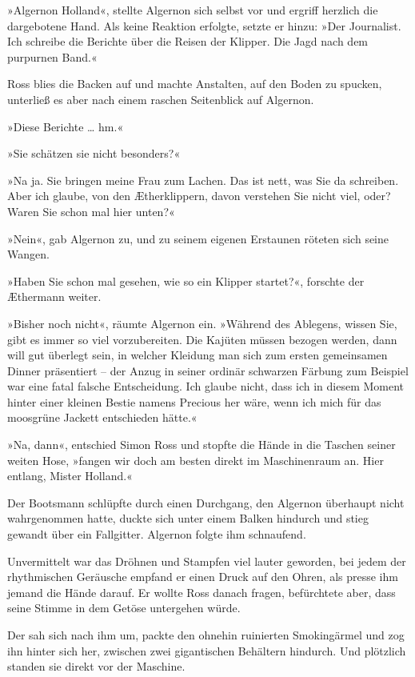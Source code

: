 »Algernon Holland«, stellte Algernon sich selbst vor und ergriff
herzlich die dargebotene Hand. Als keine Reaktion erfolgte, setzte
er hinzu: »Der Journalist. Ich schreibe die Berichte über die
Reisen der Klipper. Die Jagd nach dem purpurnen Band.«

Ross blies die Backen auf und machte Anstalten, auf den Boden zu
spucken, unterließ es aber nach einem raschen Seitenblick auf
Algernon.

»Diese Berichte \ldots{} hm.«

»Sie schätzen sie nicht besonders?«

»Na ja. Sie bringen meine Frau zum Lachen. Das ist nett, was Sie da
schreiben. Aber ich glaube, von den Ætherklippern, davon verstehen
Sie nicht viel, oder? Waren Sie schon mal hier unten?«

»Nein«, gab Algernon zu, und zu seinem eigenen Erstaunen röteten
sich seine Wangen.

»Haben Sie schon mal gesehen, wie so ein Klipper startet?«,
forschte der Æthermann weiter.

»Bisher noch nicht«, räumte Algernon ein. »Während des Ablegens,
wissen Sie, gibt es immer so viel vorzubereiten. Die Kajüten müssen
bezogen werden, dann will gut überlegt sein, in welcher Kleidung
man sich zum ersten gemeinsamen Dinner präsentiert – der Anzug in
seiner ordinär schwarzen Färbung zum Beispiel war eine fatal
falsche Entscheidung. Ich glaube nicht, dass ich in diesem Moment
hinter einer kleinen Bestie namens Precious her wäre, wenn ich mich
für das moosgrüne Jackett entschieden hätte.«

»Na, dann«, entschied Simon Ross und stopfte die Hände in die
Taschen seiner weiten Hose, »fangen wir doch am besten direkt im
Maschinenraum an. Hier entlang, Mister Holland.«

Der Bootsmann schlüpfte durch einen Durchgang, den Algernon
überhaupt nicht wahrgenommen hatte, duckte sich unter einem Balken
hindurch und stieg gewandt über ein Fallgitter. Algernon folgte ihm
schnaufend.

Unvermittelt war das Dröhnen und Stampfen viel lauter geworden, bei
jedem der rhythmischen Geräusche empfand er einen Druck auf den
Ohren, als presse ihm jemand die Hände darauf. Er wollte Ross
danach fragen, befürchtete aber, dass seine Stimme in dem Getöse
untergehen würde.

Der sah sich nach ihm um, packte den ohnehin ruinierten
Smokingärmel und zog ihn hinter sich her, zwischen zwei
gigantischen Behältern hindurch. Und plötzlich standen sie direkt
vor der Maschine.

